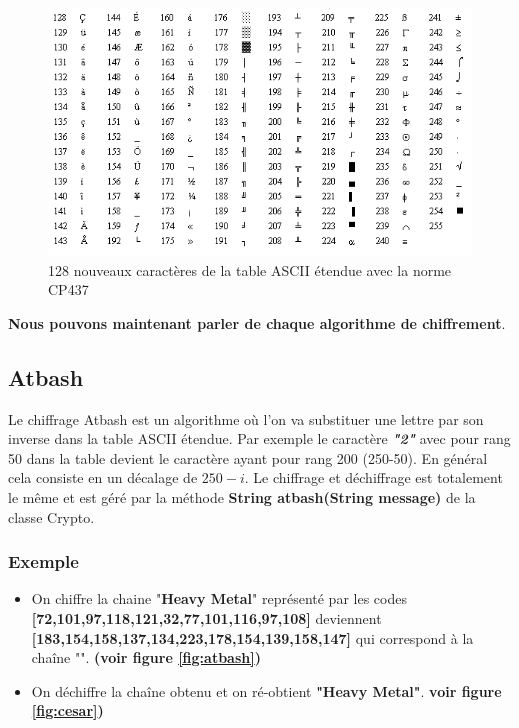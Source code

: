 \documentclass{article}
\begin{document}
\begin{figure}[h!]
\centering
\includegraphics[scale=0.5]{./img/cp437.png}
\caption{128 nouveaux caractères de la table ASCII étendue avec la norme CP437 \label{fig:cp437}}
\end{figure}
\vspace{1\baselineskip}

\textbf{Nous pouvons maintenant parler de chaque algorithme de chiffrement}.

\subsection{Atbash}

Le chiffrage Atbash est un algorithme où l'on va substituer une lettre par son inverse dans la table ASCII étendue. Par exemple le caractère \textit{\textbf{"2"}} avec pour rang 50 dans la table devient le caractère ayant pour rang 200 (250-50). En général cela consiste en un décalage de $250 - i$. 
Le chiffrage et déchiffrage est totalement le même et est géré par la méthode \textbf{String atbash(String message)} de la classe Crypto.
\subsubsection{Exemple}
\begin{itemize}
\item On chiffre la chaine "\textbf{Heavy Metal}" représenté par les codes \textbf{[72,101,97,118,121,32,77,101,116,97,108]} deviennent \textbf{[183,154,158,137,134,223,178,154,139,158,147]} qui correspond à la chaîne "". \textbf{(voir figure \ref{fig:atbash})}
\item On déchiffre la chaîne obtenu et on ré-obtient \textbf{"Heavy Metal"}. \textbf{voir figure \ref{fig:cesar})} 
\end{itemize}
\end{document}

